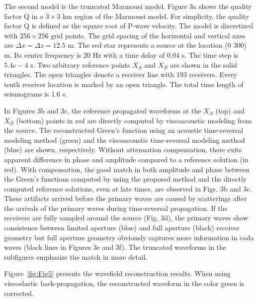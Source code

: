 The second model is the truncated Marmousi model. Figure 3a shows the quality factor Q in a $3\times 3$ km region of the Marmousi model. For simplicity, the quality factor Q is defined as the square root of P-wave velocity. The model is discretized with $256\times 256$ grid points. The grid spacing of the horizontal and vertical axes are $\Delta x=\Delta z=12.5$  m. The red star represents a source at the location (0 300) m. Its center frequency is 20 Hz with a time delay of 0.04 s. The time step is $5.4e-4$ s. Two arbitrary reference points $X_A$ and $X_B$ are shown in the solid triangles. The open triangles denote a receiver line with 193 receivers. Every tenth receiver location is marked by an open triangle. The total time length of seismograms is 1.6 s.

In Figures 3b and 3c, the reference propagated waveforms at the $X_A$ (top) and $X_B$ (bottom) points in red are directly computed by viscoacoustic modeling from the source. The reconstructed Green’s function using an acoustic time-reversal modeling method (green) and the viscoacoustic time-reversal modeling method (blue) are shown, respectively. Without attenuation compensation, there exits apparent difference in phase and amplitude compared to a reference solution (in red). With compensation, the good match in both amplitude and phase between the Green's functions computed by using the proposed method and the directly computed reference solutions, even at late times, are observed in Figs. 3b and 3c. These artifacts arrived before the primary waves are caused by scatterings after the arrivals of the primary waves during time-reversal propagation. If the receivers are fully sampled around the source (Fig. 3d), the primary waves show consistence between limited aperture (blue) and full aperture (black) receiver geometry but full aperture geometry obviously captures more information in coda waves (black lines in Figures 3e and 3f). The truncated waveforms in the subfigures emphasize the match in more detail.


Figure~\ref{fig:Fig5} presents the wavefield reconstruction results. When using viscoelastic back-propagation, the reconstructed waveform in the color green is corrected.  


